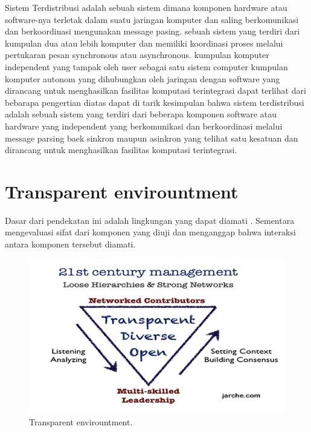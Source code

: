 \documentclass{jtetiproposalskripsi}
\begin{document}
Sistem Terdistribusi adalah sebuah sistem dimana komponen hardware atau software-nya terletak dalam suatu jaringan komputer dan saling berkomunikasi dan berkoordinasi mengunakan message pasing. sebuah sistem yang terdiri dari kumpulan dua atau lebih komputer dan memiliki koordinasi proses melalui pertukaran pesan synchronous atau asynchronous. kumpulan komputer independent yang tampak oleh user sebagai satu sistem computer kumpulan komputer autonom yang dihubungkan oleh jaringan dengan software yang dirancang untuk menghasilkan fasilitas komputasi terintegrasi dapat terlihat dari bebarapa pengertian diatas dapat di tarik kesimpulan bahwa sistem terdistribusi adalah sebuah sistem yang terdiri dari beberapa komponen software atau hardware yang independent yang berkomunikasi dan berkoordinasi melalui message parsing baek sinkron maupun asinkron yang telihat satu kesatuan dan dirancang untuk menghasilkan fasilitas komputasi terintegrasi.


\section{Transparent envirountment}

Dasar dari pendekatan ini adalah lingkungan yang dapat diamati . Sementara mengevaluasi sifat dari komponen yang diuji dan menganggap bahwa interaksi antara komponen tersebut diamati.

\begin{figure}[ht!]
  \centering
    \includegraphics{gambar/2}
    \caption{Transparent envirountment.}
    \label{wsn}
\end{figure}
\end{document}
